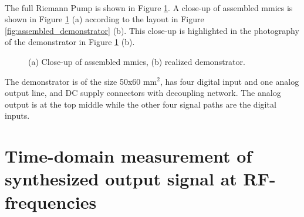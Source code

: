 \documentclass[journal]{IEEEtran}
\begin{document}
\\
The full Riemann Pump is shown in Figure \ref{fig:photo_chipconnection_demonstrator}.
A close-up of assembled \glspl{mmic} is shown in Figure \ref{fig:photo_chipconnection_demonstrator} (a) according to the layout in Figure \ref{fig:assembled_demonstrator} (b).
This close-up is highlighted in the photography of the demonstrator in Figure \ref{fig:photo_chipconnection_demonstrator} (b).
\begin{figure}[htb]
  \centering
	\begin{scriptsize}
  	\def\svgwidth{\columnwidth}
 	 
  	\caption{(a) Close-up of assembled \glspl{mmic}, (b) realized demonstrator.}
  	\label{fig:photo_chipconnection_demonstrator}
	\end{scriptsize}
\end{figure}
The demonstrator is of the size 50x60 $\text{mm}^2$, has four digital input and one analog output line, and DC supply connectors with decoupling network.
The analog output is at the top middle while the other four signal paths are the digital inputs.
%
\section{Time-domain measurement of synthesized output signal at RF- frequencies}
\label{sec:experiment}
\end{document}
